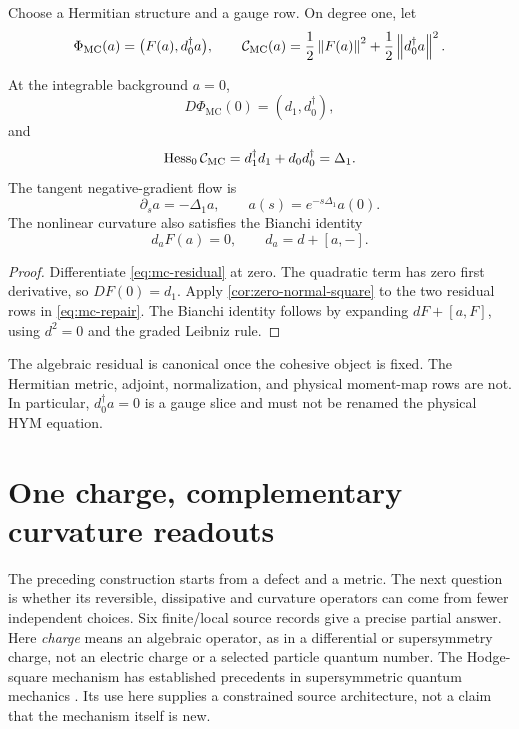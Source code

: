 \documentclass[11pt,a4paper]{article}
\newcommand{\MC}{\mathrm{MC}}
\begin{document}
Choose a Hermitian structure and a gauge row.  On degree one, let
\begin{equation}
\Phi_{\MC}(a)=\bigl(F(a),d_0^{\dagger}a\bigr),
\qquad
\calC_{\MC}(a)=\frac12\norm{F(a)}^2
+\frac12\norm{d_0^{\dagger}a}^2.
\label{eq:mc-repair}
\end{equation}

\begin{theorem}
\label{thm:mc-repair}
At the integrable background \(a=0\),
\begin{equation}
D\Phi_{\MC}(0)=(d_1,d_0^{\dagger}),
\end{equation}
and
\begin{equation}
\Hess_0\calC_{\MC}
=d_1^{\dagger}d_1+d_0d_0^{\dagger}
=\Delta_1.
\label{eq:mc-hodge}
\end{equation}
The tangent negative-gradient flow is
\[
\partial_s a=-\Delta_1a,
\qquad
a(s)=e^{-s\Delta_1}a(0).
\]
The nonlinear curvature also satisfies the Bianchi identity
\[
d_aF(a)=0,
\qquad
d_a=d+[a,-].
\]
\end{theorem}

\begin{proof}
Differentiate \eqref{eq:mc-residual} at zero.  The quadratic term has zero
first derivative, so \(DF(0)=d_1\).  Apply
\cref{cor:zero-normal-square} to the two residual rows in
\eqref{eq:mc-repair}.  The Bianchi identity follows by expanding
\(dF+[a,F]\), using \(d^2=0\) and the graded Leibniz rule.
\end{proof}

The algebraic residual is canonical once the cohesive object is fixed.  The
Hermitian metric, adjoint, normalization, and physical moment-map rows are
not.  In particular, \(d_0^{\dagger}a=0\) is a gauge slice and must not be
renamed the physical HYM equation.

\section{One charge, complementary curvature readouts}
\label{sec:charge-curvature}

The preceding construction starts from a defect and a metric. The next
question is whether its reversible, dissipative and curvature operators
can come from fewer independent choices. Six finite/local source records
give a precise partial answer. Here \emph{charge} means an algebraic
operator, as in a differential or supersymmetry charge, not an electric
charge or a selected particle quantum number. The Hodge-square mechanism
has established precedents in supersymmetric quantum mechanics
\cite{WittenMorse1982}. Its use here supplies a constrained source
architecture, not a claim that the mechanism itself is new.
\end{document}
